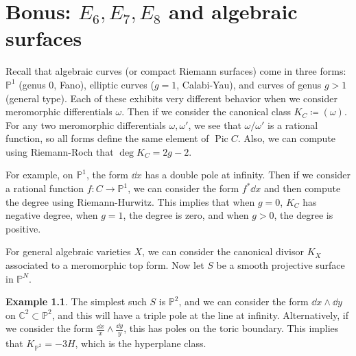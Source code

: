 \documentclass[leqno, openany]{memoir}
\theoremstyle{definition}
\newtheorem{exm}[thm]{Example}
\theoremstyle{remark}
\theoremstyle{plain}
\theoremstyle{definition}
\theoremstyle{remark}
\newcommand{\C}{\mathbb{C}}
\renewcommand{\P}{\mathbb{P}}
\DeclareMathOperator{\Pic}{Pic}
\begin{document}
\chapter{Bonus: $E_6, E_7, E_8$ and algebraic surfaces}%
\label{cha:bonus_e_6_e_7_e_8_and_algebraic_surfaces}

Recall that algebraic curves (or compact Riemann surfaces) come in three forms: $\P^1$ (genus $0$, Fano), elliptic curves ($g=1$, Calabi-Yau), and curves of genus $g > 1$ (general type). Each of these exhibits very different behavior when we consider meromorphic differentials $\omega$. Then if we consider the canonical class $K_C \coloneqq (\omega)$. For any two meromorphic differentials $\omega, \omega'$, we see that $\omega / \omega'$ is a rational function, so all forms define the same element of $\Pic C$. Also, we can compute using Riemann-Roch that $\deg K_C = 2g-2$.

For example, on $\P^1$, the form $\dd{x}$ has a double pole at infinity. Then if we consider a rational function $f \colon C \to \P^1$, we can consider the form $f^* \dd{x}$ and then compute the degree using Riemann-Hurwitz. This implies that when $g = 0$, $K_C$ has negative degree, when $g=1$, the degree is zero, and when $g>0$, the degree is positive.

For general algebraic varieties $X$, we can consider the canonical divisor $K_X$ associated to a meromorphic top form. Now let $S$ be a smooth projective surface in $\P^N$. 

\begin{exm}
    The simplest such $S$ is $\P^2$, and we can consider the form $\dd{x} \wedge \dd{y}$ on $\C^2 \subset \P^2$, and this will have a triple pole at the line at infinity. Alternatively, if we consider the form $\frac{\dd{x}}{x} \wedge \frac{\dd{y}}{y}$, this has poles on the toric boundary. This implies that $K_{\P^2} = -3H$, which is the hyperplane class.
\end{exm}
\end{document}
